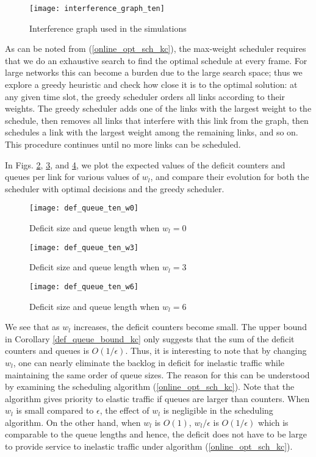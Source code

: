 \documentclass[conference]{IEEEtran}
\begin{document}
\begin{figure}[t]
	\centering
	\texttt{[image: interference\_graph\_ten]}
	\caption{Interference graph used in the simulations}
	\label{interference_graph}
\end{figure}

As can be noted from (\ref{online_opt_sch_kc}), the max-weight scheduler requires that we do an exhaustive search to find the optimal schedule at every frame. For large networks this can become a burden due to the large search space; thus we explore a greedy heuristic and check how close it is to the optimal solution: at any given time slot, the greedy scheduler orders all links according to their weights. The greedy scheduler adds one of the links with the largest weight to the schedule, then removes all links that interfere with this link from the graph, then schedules a link with the largest weight among the remaining links, and so on. This procedure continues until no more links can be scheduled.



In Figs. \ref{def_queue_ten_w0}, \ref{def_queue_ten_w3}, and \ref{def_queue_ten_w6}, we plot the expected values of the deficit counters and queues per link for various values of $w_l$, and compare their evolution for both the scheduler with optimal decisions and the greedy scheduler.

\begin{figure}[t]
	\centering
	\texttt{[image: def\_queue\_ten\_w0]}
	\caption{Deficit size and queue length when $w_l=0$}
	\label{def_queue_ten_w0}
\end{figure}
\begin{figure}[t]
	\centering
	\texttt{[image: def\_queue\_ten\_w3]}
	\caption{Deficit size and queue length when $w_l=3$}
	\label{def_queue_ten_w3}
\end{figure}
\begin{figure}[t]
	\centering
	\texttt{[image: def\_queue\_ten\_w6]}
	\caption{Deficit size and queue length when $w_l=6$}
	\label{def_queue_ten_w6}
\end{figure}

We see that as $w_l$ increases, the deficit counters become small. The upper bound in Corollary \ref{def_queue_bound_kc} only suggests that the sum of the deficit counters and queues is $O(1 / \epsilon)$. Thus, it is interesting to note that by changing $w_l$, one can nearly eliminate the backlog in deficit for inelastic traffic while maintaining the same order of queue sizes. The reason for this can be understood by examining the scheduling algorithm (\ref{online_opt_sch_kc}). Note that the algorithm gives priority to elastic traffic if queues are larger than counters. When $w_l$ is small compared to $\epsilon$, the effect of $w_l$ is negligible in the scheduling algorithm. On the other hand, when $w_l$ is $O(1)$, $w_l / \epsilon$ is $O(1 / \epsilon)$ which is comparable to the queue lengths and hence, the deficit does not have to be large to provide service to inelastic traffic under algorithm (\ref{online_opt_sch_kc}).
\end{document}

